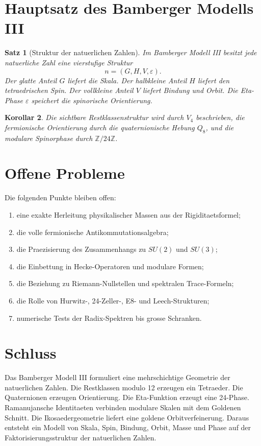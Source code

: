 \documentclass[11pt,a4paper]{article}
\newtheorem{satz}{Satz}[section]
\newtheorem{korollar}[satz]{Korollar}
\theoremstyle{definition}
\theoremstyle{remark}
\newcommand{\Z}{\mathbb Z}
\newcommand{\eps}{\varepsilon}
\begin{document}
\section{Hauptsatz des Bamberger Modells III}

\begin{satz}[Struktur der natuerlichen Zahlen]
Im Bamberger Modell III besitzt jede natuerliche Zahl eine vierstufige Struktur
\[
n=(G,H,V,\eps).
\]
Der glatte Anteil \(G\) liefert die Skala. Der halbkleine Anteil \(H\) liefert
den tetraedrischen Spin. Der vollkleine Anteil \(V\) liefert Bindung und Orbit.
Die Eta-Phase \(\eps\) speichert die spinorische Orientierung.
\end{satz}

\begin{korollar}
Die sichtbare Restklassenstruktur wird durch \(V_4\) beschrieben, die
fermionische Orientierung durch die quaternionische Hebung \(Q_8\), und die
modulare Spinorphase durch \(\Z/24\Z\).
\end{korollar}

\section{Offene Probleme}

Die folgenden Punkte bleiben offen:
\begin{enumerate}[label=\arabic*.]
\item eine exakte Herleitung physikalischer Massen aus der Rigiditaetsformel;
\item die volle fermionische Antikommutationsalgebra;
\item die Praezisierung des Zusammenhangs zu \(SU(2)\) und \(SU(3)\);
\item die Einbettung in Hecke-Operatoren und modulare Formen;
\item die Beziehung zu Riemann-Nullstellen und spektralen Trace-Formeln;
\item die Rolle von Hurwitz-, 24-Zeller-, E8- und Leech-Strukturen;
\item numerische Tests der Radix-Spektren bis grosse Schranken.
\end{enumerate}

\section{Schluss}

Das Bamberger Modell III formuliert eine mehrschichtige Geometrie der
natuerlichen Zahlen. Die Restklassen modulo 12 erzeugen ein Tetraeder. Die
Quaternionen erzeugen Orientierung. Die Eta-Funktion erzeugt eine 24-Phase.
Ramanujansche Identitaeten verbinden modulare Skalen mit dem Goldenen Schnitt.
Die Ikosaedergeometrie liefert eine goldene Orbitverfeinerung. Daraus entsteht
ein Modell von Skala, Spin, Bindung, Orbit, Masse und Phase auf der
Faktorisierungsstruktur der natuerlichen Zahlen.
\end{document}
